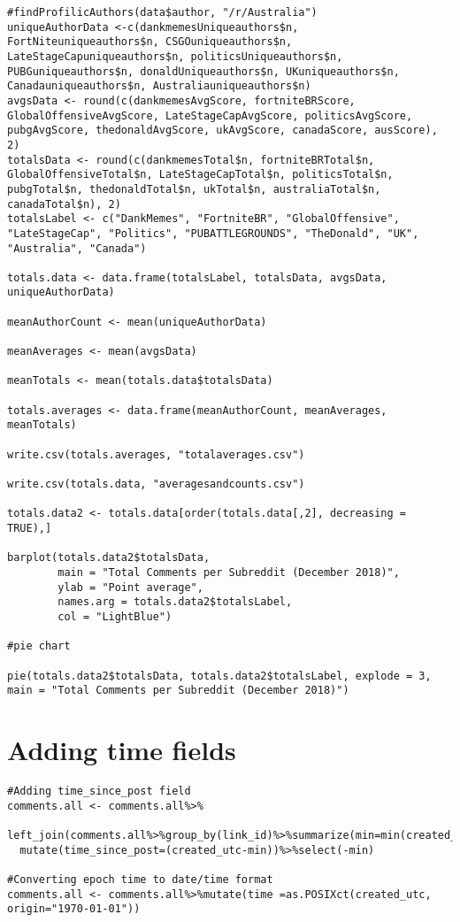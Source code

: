 \begin{lstlisting}
#findProfilicAuthors(data$author, "/r/Australia")
uniqueAuthorData <-c(dankmemesUniqueauthors$n, FortNiteuniqueauthors$n, CSGOuniqueauthors$n, LateStageCapuniqueauthors$n, politicsUniqueauthors$n, PUBGuniqueauthors$n, donaldUniqueauthors$n, UKuniqueauthors$n, Canadauniqueauthors$n, Australiauniqueauthors$n)
avgsData <- round(c(dankmemesAvgScore, fortniteBRScore, GlobalOffensiveAvgScore, LateStageCapAvgScore, politicsAvgScore, pubgAvgScore, thedonaldAvgScore, ukAvgScore, canadaScore, ausScore), 2)
totalsData <- round(c(dankmemesTotal$n, fortniteBRTotal$n, GlobalOffensiveTotal$n, LateStageCapTotal$n, politicsTotal$n, pubgTotal$n, thedonaldTotal$n, ukTotal$n, australiaTotal$n, canadaTotal$n), 2)
totalsLabel <- c("DankMemes", "FortniteBR", "GlobalOffensive", "LateStageCap", "Politics", "PUBATTLEGROUNDS", "TheDonald", "UK", "Australia", "Canada")

totals.data <- data.frame(totalsLabel, totalsData, avgsData, uniqueAuthorData)

meanAuthorCount <- mean(uniqueAuthorData)

meanAverages <- mean(avgsData)

meanTotals <- mean(totals.data$totalsData)

totals.averages <- data.frame(meanAuthorCount, meanAverages, meanTotals)

write.csv(totals.averages, "totalaverages.csv")

write.csv(totals.data, "averagesandcounts.csv")

totals.data2 <- totals.data[order(totals.data[,2], decreasing = TRUE),]

barplot(totals.data2$totalsData,
        main = "Total Comments per Subreddit (December 2018)",
        ylab = "Point average",
        names.arg = totals.data2$totalsLabel,
        col = "LightBlue")

#pie chart

pie(totals.data2$totalsData, totals.data2$totalsLabel, explode = 3, main = "Total Comments per Subreddit (December 2018)")

\end{lstlisting}

\section{Adding time fields}
\label{sec:AppendexA2}
\begin{lstlisting}
#Adding time_since_post field
comments.all <- comments.all%>%
  left_join(comments.all%>%group_by(link_id)%>%summarize(min=min(created_utc)))%>%
  mutate(time_since_post=(created_utc-min))%>%select(-min)

#Converting epoch time to date/time format
comments.all <- comments.all%>%mutate(time =as.POSIXct(created_utc, origin="1970-01-01"))
\end{lstlisting}

